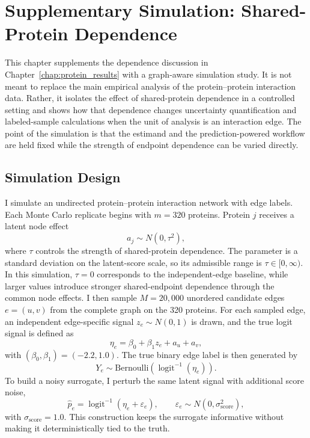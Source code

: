 \chapter{Supplementary Simulation: Shared-Protein Dependence}

This chapter supplements the dependence discussion in Chapter~\ref{chap:protein_results} with a graph-aware simulation study. It is not meant to replace the main empirical analysis of the protein--protein interaction data. Rather, it isolates the effect of shared-protein dependence in a controlled setting and shows how that dependence changes uncertainty quantification and labeled-sample calculations when the unit of analysis is an interaction edge. The point of the simulation is that the estimand and the prediction-powered workflow are held fixed while the strength of endpoint dependence can be varied directly.

\section{Simulation Design}

I simulate an undirected protein--protein interaction network with edge labels. Each Monte Carlo replicate begins with $m=320$ proteins. Protein $j$ receives a latent node effect
\[
a_j \sim N(0, \tau^2),
\]
where $\tau$ controls the strength of shared-protein dependence. The parameter is a standard deviation on the latent-score scale, so its admissible range is $\tau \in [0,\infty)$. In this simulation, $\tau=0$ corresponds to the independent-edge baseline, while larger values introduce stronger shared-endpoint dependence through the common node effects. I then sample $M=20{,}000$ unordered candidate edges $e=(u,v)$ from the complete graph on the 320 proteins. For each sampled edge, an independent edge-specific signal $z_e \sim N(0,1)$ is drawn, and the true logit signal is defined as
\[
\eta_e = \beta_0 + \beta_1 z_e + a_u + a_v,
\]
with $(\beta_0,\beta_1)=(-2.2,1.0)$. The true binary edge label is then generated by
\[
Y_e \sim \mathrm{Bernoulli}\!\left(\operatorname{logit}^{-1}(\eta_e)\right).
\]
To build a noisy surrogate, I perturb the same latent signal with additional score noise,
\[
\hat p_e = \operatorname{logit}^{-1}(\eta_e + \varepsilon_e),
\qquad
\varepsilon_e \sim N(0, \sigma_{\mathrm{score}}^2),
\]
with $\sigma_{\mathrm{score}}=1.0$. This construction keeps the surrogate informative without making it deterministically tied to the truth.

